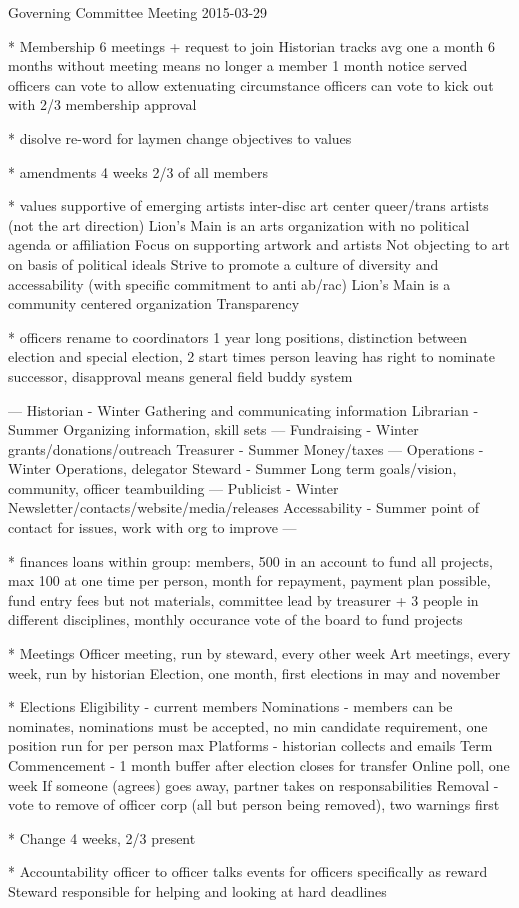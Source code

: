 Governing Committee Meeting 2015-03-29

* Membership
6 meetings + request to join
Historian tracks
avg one a month
6 months without meeting means no longer a member
1 month notice served
officers can vote to allow extenuating circumstance
officers can vote to kick out with 2/3 membership approval

* disolve
re-word for laymen
change objectives to values

* amendments
4 weeks
2/3 of all members

* values
supportive of emerging artists
inter-disc art
center queer/trans artists (not the art direction)
Lion's Main is an arts organization with no political agenda or affiliation
Focus on supporting artwork and artists
Not objecting to art on basis of political ideals
Strive to promote a culture of diversity and accessability (with specific commitment to anti ab/rac)
Lion's Main is a community centered organization
Transparency

* officers
rename to coordinators
1 year long positions, distinction between election and special election, 2 start times
person leaving has right to nominate successor, disapproval means general field
buddy system

---
Historian - Winter
  Gathering and communicating information
Librarian - Summer
  Organizing information, skill sets
---
Fundraising - Winter
  grants/donations/outreach
Treasurer - Summer
  Money/taxes
---
Operations - Winter
  Operations, delegator
Steward - Summer
  Long term goals/vision, community, officer teambuilding
---
Publicist - Winter
  Newsletter/contacts/website/media/releases
Accessability - Summer
  point of contact for issues, work with org to improve
---

* finances
loans within group: members, 500 in an account to fund all projects, max 100 at one time per person, month for repayment, payment plan possible, fund entry fees but not materials, committee lead by treasurer + 3 people in different disciplines, monthly occurance
vote of the board to fund projects

* Meetings
Officer meeting, run by steward, every other week
Art meetings, every week, run by historian
Election, one month, first elections in may and november

* Elections
Eligibility - current members
Nominations - members can be nominates, nominations must be accepted, no min candidate requirement, one position run for per person max
Platforms - historian collects and emails
Term Commencement - 1 month buffer after election closes for transfer
Online poll, one week
If someone (agrees) goes away, partner takes on responsabilities
Removal - vote to remove of officer corp (all but person being removed), two warnings first

* Change
4 weeks, 2/3 present

* Accountability
officer to officer talks
events for officers specifically as reward
Steward responsible for helping and looking at hard deadlines
